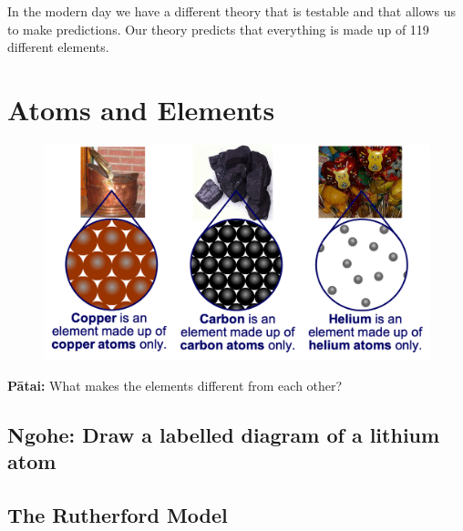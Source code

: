 \documentclass[12pt]{report}
\begin{document}
In the modern day we have a different theory that is testable and that allows us to make predictions. Our theory predicts that everything is made up of 119 different elements.

\section{Atoms and Elements}

\begin{figure}
	\vspace{-1cm}
	\begin{center}
		\includegraphics[width=0.9\linewidth]{elements.png}
	\end{center}
\end{figure}

\textbf{Pātai:} What makes the elements different from each other?\\
\vspace{2cm}

\subsection{Ngohe: Draw a labelled diagram of a lithium atom}

\newpage
\subsection{The Rutherford Model}
\end{document}
